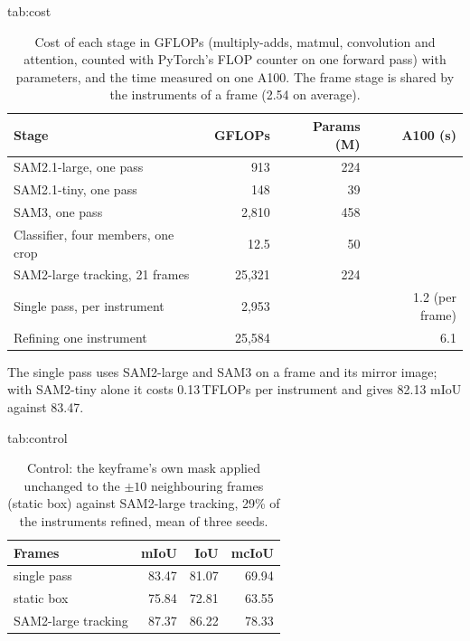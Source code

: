 \begin{table}[h]
\floatconts
  {tab:cost}
  {\caption{Cost of each stage in GFLOPs (multiply-adds, matmul, convolution and attention, counted with PyTorch's FLOP counter on one forward pass) with parameters, and the time measured on one A100. The frame stage is shared by the instruments of a frame (2.54 on average).}}
  {\footnotesize\setlength{\tabcolsep}{4pt}\begin{tabular}{lrrr}
  \toprule
  \bfseries Stage & \bfseries GFLOPs & \bfseries Params (M) & \bfseries A100 (s)\\
  \midrule
  SAM2.1-large, one pass & 913 & 224 & \\
  SAM2.1-tiny, one pass & 148 & 39 & \\
  SAM3, one pass & 2,810 & 458 & \\
  Classifier, four members, one crop & 12.5 & 50 & \\
  SAM2-large tracking, 21 frames & 25,321 & 224 & \\
  \midrule
  Single pass, per instrument & 2,953 & & 1.2 (per frame)\\
  Refining one instrument & 25,584 & & 6.1\\
  \bottomrule
  \end{tabular}}
\end{table}
The single pass uses SAM2-large and SAM3 on a frame and its mirror image; with SAM2-tiny alone it costs 0.13\,TFLOPs per instrument and gives 82.13 mIoU against 83.47.

\begin{table}[h]
\floatconts
  {tab:control}
  {\caption{Control: the keyframe's own mask applied unchanged to the $\pm10$ neighbouring frames (static box) against SAM2-large tracking, 29\% of the instruments refined, mean of three seeds.}}
  {\small\begin{tabular}{lrrr}
  \toprule
  \bfseries Frames & \bfseries mIoU & \bfseries IoU & \bfseries mcIoU\\
  \midrule
  single pass & 83.47 & 81.07 & 69.94\\
  static box & 75.84 & 72.81 & 63.55\\
  SAM2-large tracking & 87.37 & 86.22 & 78.33\\
  \bottomrule
  \end{tabular}}
\end{table}

